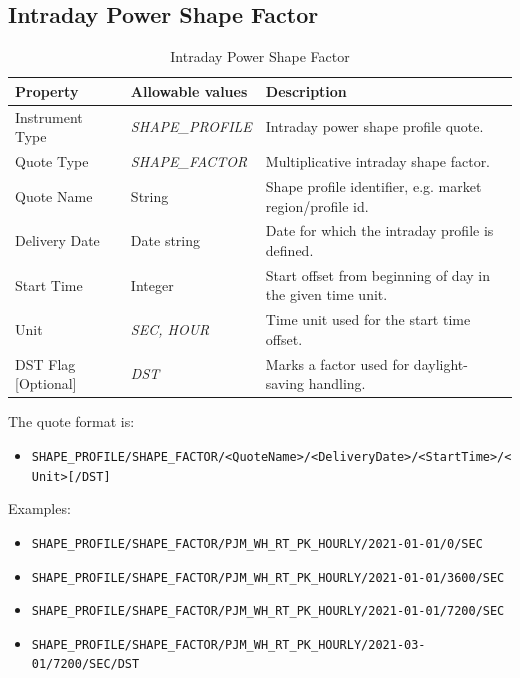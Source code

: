 \subsection{Intraday Power Shape Factor}
\label{md:intraday_power_shape_factor}

\begin{table}[H]
  \centering
  \begin{tabular}{|p{3.2cm}|p{4.8cm}|p{6.8cm}|}
    \hline
    {\bf Property} & {\bf Allowable values} & {\bf Description} \\ \hline
    Instrument Type & \emph{SHAPE\_PROFILE} & Intraday power shape profile quote. \\ \hline
    Quote Type & \emph{SHAPE\_FACTOR} & Multiplicative intraday shape factor. \\ \hline
    Quote Name & String & Shape profile identifier, e.g. market region/profile id. \\ \hline
    Delivery Date & Date string & Date for which the intraday profile is defined. \\ \hline
    Start Time & Integer & Start offset from beginning of day in the given time unit. \\ \hline
    Unit & \emph{SEC, HOUR} & Time unit used for the start time offset. \\ \hline
    DST Flag [Optional] & \emph{DST} & Marks a factor used for daylight-saving handling. \\ \hline
  \end{tabular}
  \caption{Intraday Power Shape Factor}
  \label{tab:intraday_power_shape_factor_quote}
\end{table}

The quote format is:
\begin{itemize}
  \item \lstinline!SHAPE_PROFILE/SHAPE_FACTOR/<QuoteName>/<DeliveryDate>/<StartTime>/<Unit>[/DST]!
\end{itemize}

Examples:
\begin{itemize}
  \item \lstinline!SHAPE_PROFILE/SHAPE_FACTOR/PJM_WH_RT_PK_HOURLY/2021-01-01/0/SEC!
  \item \lstinline!SHAPE_PROFILE/SHAPE_FACTOR/PJM_WH_RT_PK_HOURLY/2021-01-01/3600/SEC!
  \item \lstinline!SHAPE_PROFILE/SHAPE_FACTOR/PJM_WH_RT_PK_HOURLY/2021-01-01/7200/SEC!
  \item \lstinline!SHAPE_PROFILE/SHAPE_FACTOR/PJM_WH_RT_PK_HOURLY/2021-03-01/7200/SEC/DST!
\end{itemize}

